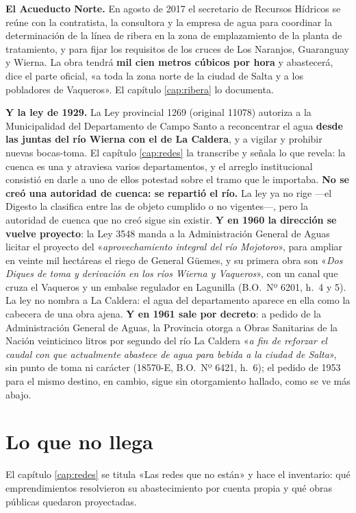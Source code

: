 \textbf{El Acueducto Norte.} En agosto de 2017 el secretario de Recursos Hídricos se reúne con
la contratista, la consultora y la empresa de agua para coordinar la determinación de la línea
de ribera en la zona de emplazamiento de la planta de tratamiento, y para fijar los requisitos
de los cruces de Los Naranjos, Guaranguay y Wierna. La obra tendrá \textbf{mil cien metros
cúbicos por hora} y abastecerá, dice el parte oficial, «a toda la zona norte de la ciudad de
Salta y a los pobladores de Vaqueros». El capítulo \ref{cap:ribera} lo documenta.

\textbf{Y la ley de 1929.} La Ley provincial 1269 (original 11078) autoriza a la Municipalidad del
Departamento de Campo Santo a reconcentrar el agua \textbf{desde las juntas del río Wierna con
el de La Caldera}, y a vigilar y prohibir nuevas bocas-toma. El capítulo \ref{cap:redes} la
transcribe y señala lo que revela: la cuenca es una y atraviesa varios departamentos, y el
arreglo institucional consistió en darle a uno de ellos potestad sobre el tramo que le
importaba. \textbf{No se creó una autoridad de cuenca: se repartió el río.} La ley ya no rige ---el Digesto la clasifica entre las de objeto cumplido o no vigentes---, pero la autoridad de cuenca que no creó sigue sin existir. \textbf{Y en 1960 la dirección se vuelve proyecto}: la Ley 3548 manda a la Administración General de Aguas licitar el proyecto del «\textit{aprovechamiento integral del río Mojotoro}», para ampliar en veinte mil hectáreas el riego de General Güemes, y su primera obra son «\textit{Dos Diques de toma y derivación en los ríos Wierna y Vaqueros}», con un canal que cruza el Vaqueros y un embalse regulador en Lagunilla (B.O.\ Nº 6201, h.\ 4 y 5). La ley no nombra a La Caldera: el agua del departamento aparece en ella como la cabecera de una obra ajena. \textbf{Y en 1961 sale por decreto}: a pedido de la Administración General de Aguas, la Provincia otorga a Obras Sanitarias de la Nación veinticinco litros por segundo del río La Caldera «\textit{a fin de reforzar el caudal con que actualmente abastece de agua para bebida a la ciudad de Salta}», sin punto de toma ni carácter (18570-E, B.O.\ Nº 6421, h.\ 6); el pedido de 1953 para el mismo destino, en cambio, sigue sin otorgamiento hallado, como se ve más abajo.

\section{Lo que no llega}

El capítulo \ref{cap:redes} se titula «Las redes que no están» y hace el inventario: qué
emprendimientos resolvieron su abastecimiento por cuenta propia y qué obras públicas quedaron
proyectadas.

